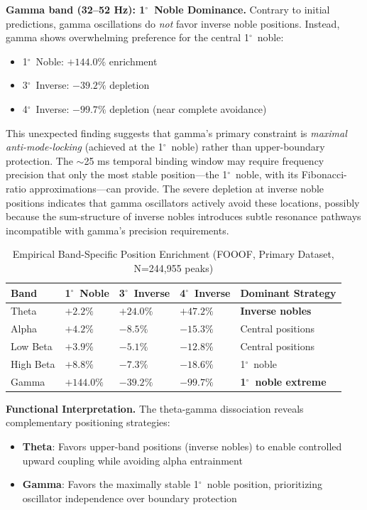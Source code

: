 \documentclass[11pt,a4paper]{article}
\newcommand{\degree}{$^\circ$}  %
\begin{document}
\textbf{Gamma band (32--52 Hz): 1\degree\ Noble Dominance.}
Contrary to initial predictions, gamma oscillations do \textit{not} favor inverse noble positions. Instead, gamma shows overwhelming preference for the central 1\degree\ noble:
\begin{itemize}
    \item 1\degree\ Noble: $+144.0\%$ enrichment
    \item 3\degree\ Inverse: $-39.2\%$ depletion
    \item 4\degree\ Inverse: $-99.7\%$ depletion (near complete avoidance)
\end{itemize}

This unexpected finding suggests that gamma's primary constraint is \textit{maximal anti-mode-locking} (achieved at the 1\degree\ noble) rather than upper-boundary protection. The $\sim$25 ms temporal binding window may require frequency precision that only the most stable position---the 1\degree\ noble, with its Fibonacci-ratio approximations---can provide. The severe depletion at inverse noble positions indicates that gamma oscillators actively avoid these locations, possibly because the sum-structure of inverse nobles introduces subtle resonance pathways incompatible with gamma's precision requirements.

\begin{table}[H]
\centering
\caption{Empirical Band-Specific Position Enrichment (FOOOF, Primary Dataset, N=244,955 peaks)}
\label{tab:band_position_empirical}
\begin{tabular}{@{}lllll@{}}
\toprule
Band & 1\degree\ Noble & 3\degree\ Inverse & 4\degree\ Inverse & Dominant Strategy \\
\midrule
Theta & $+2.2\%$ & $+24.0\%$ & $+47.2\%$ & \textbf{Inverse nobles} \\
Alpha & $+4.2\%$ & $-8.5\%$ & $-15.3\%$ & Central positions \\
Low Beta & $+3.9\%$ & $-5.1\%$ & $-12.8\%$ & Central positions \\
High Beta & $+8.8\%$ & $-7.3\%$ & $-18.6\%$ & 1\degree\ noble \\
Gamma & $+144.0\%$ & $-39.2\%$ & $-99.7\%$ & \textbf{1\degree\ noble extreme} \\
\bottomrule
\end{tabular}
\end{table}

\textbf{Functional Interpretation.}
The theta-gamma dissociation reveals complementary positioning strategies:
\begin{itemize}
    \item \textbf{Theta}: Favors upper-band positions (inverse nobles) to enable controlled upward coupling while avoiding alpha entrainment
    \item \textbf{Gamma}: Favors the maximally stable 1\degree\ noble position, prioritizing oscillator independence over boundary protection
\end{itemize}
\end{document}
